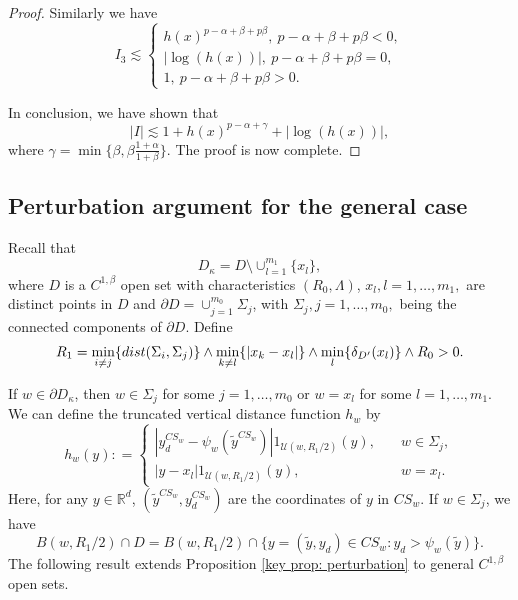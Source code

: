 \documentclass[12pt,a4paper]{amsart}
\numberwithin{equation}{section}
\theoremstyle{plain}
\newcommand{\be}{\beta}
\newcommand{\ga}{\gamma}
\newcommand{\Si}{\Sigma}
\newcommand{\mc}{\mathcal}
\newcommand{\mb}{\mathbb}
\newcommand{\wt}{\widetilde}
\newcommand{\1}{\mathbbm{1}}
\begin{document}
\begin{proof}
Similarly we have
$$
I_3\lesssim 
\begin{cases}
h(x)^{p-\alpha + \be + p\be},\ p-\alpha + \be + p\be < 0, \\
|\log(h(x))|,\ p-\alpha + \be + p\be= 0, \\
1,\ p-\alpha + \be + p\be>0.
\end{cases}
$$


In conclusion, we have shown that
\begin{equation}
|I| \lesssim 1 + h(x)^{p-\alpha + \gamma}+ | \log(h(x))|,
\end{equation}
where $\ga = \min\{\beta, \beta \frac{1+\alpha}{1+\beta}\}$. The proof is now complete.
\end{proof}

\subsection{Perturbation argument for the general case}

Recall that
$$
D_\kappa=D\setminus \cup _{l=1}^{m_1}\{x_l\},
$$
where $D$ is a $C^{1, \beta}$ open set with characteristics $(R_0, \Lambda)$,   $x_l, l=1, \dots, m_1,$ are distinct points in $D$ and $\partial D=\cup _{j=1}^{m_0} \Si_j$, with $\Si_j, j=1, \dots, m_0,$ being the connected components of $\partial D$. 
Define
\begin{align}\label{e:R1}
R_1= \min_{i\neq j}\{{\rm dist}(\Sigma_i, \Sigma_j)
\}\wedge \min_{k\neq l}\{|x_k-x_l|\}\wedge \min_l\{\delta_{D'}(x_l)\}\wedge R_0>0.
\end{align}

If $w \in \partial D_\kappa$, then
$w \in \Si_j$ for some  $j=1, \dots, m_0$ or $w=x_l$ for some $l=1, \dots, m_1$. We can define the truncated vertical distance function $h_w$ by 
\begin{equation}\label{eqn:truncated vertical distance}
h_w(y): = 
\begin{cases}
|y_d^{CS_{w}} - \psi_w(\wt y^{CS_{w}})| 1_{\mc U(w, R_1/2 )}(y), & \quad w \in \Si_j, \\
|y - x_l|1_{\mc U(w, R_1/2 )}(y), & \quad w= x_l.
\end{cases}
\end{equation}
Here, for any $y \in \mb R^d$, $(\wt y^{CS_{w}},y_d^{CS_{w}})$ are the coordinates of $y$ in $CS_w$.
If $w \in \Si_j$, we have
\begin{equation} 
B(w,R_1/2) \cap D = B(w, R_1/2)  \cap \{y= (\widetilde{y},y_d) \in CS_w: y_d > \psi_w(\widetilde{y})\}.
\end{equation} 
The following result 
extends Proposition \ref{key prop: perturbation} to general $C^{1, \beta}$ open sets.
\end{document}
